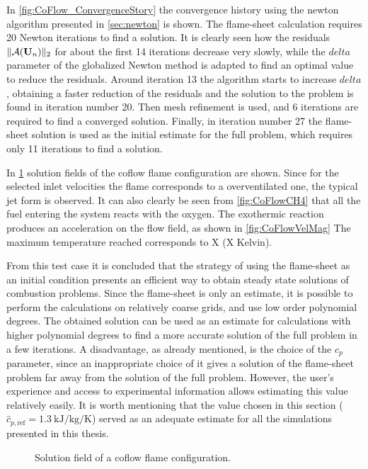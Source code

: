 In \cref{fig:CoFlow_ConvergenceStory} the convergence history using the newton algorithm presented in \cref{sec:newton} is shown. The flame-sheet calculation requires 20 Newton iterations to find a solution. It is clearly seen how the residuals $\| \mathcal{A}(\textbf{U}_{n}) \|_2 $  for about the first 14 iterations decrease very slowly, while the $delta$ parameter of the globalized Newton method is adapted to find an optimal value to reduce the residuals. Around iteration 13 the algorithm starts to increase $delta$, obtaining a faster reduction of the residuals and the solution to the problem is found in iteration number 20. Then mesh refinement is used, and 6 iterations are required to find a converged solution. Finally, in iteration number 27 the flame-sheet solution is used as the initial estimate for the full problem, which requires only 11 iterations to find a solution. 

In \cref{fig:CoFlowFlameFig} solution fields of the coflow flame configuration are shown. Since for the selected inlet velocities the flame corresponds to a overventilated one, the typical jet form is observed. It can also clearly be seen from \cref{fig:CoFlowCH4} that all the fuel entering the system reacts with the oxygen. The exothermic reaction produces an acceleration on the flow field, as shown in  \cref{fig:CoFlowVelMag}
The maximum temperature reached corresponds to X (X Kelvin). %

From this test case it is concluded that the strategy of using the flame-sheet as an initial condition presents an efficient way to obtain steady state solutions of combustion problems. Since the flame-sheet is only an estimate, it is possible to perform the calculations on relatively coarse grids, and use low order polynomial degrees. The obtained solution can be used as an estimate for calculations with higher polynomial degrees to find a more accurate solution of the full problem in a few iterations. A disadvantage, as already mentioned, is the choice of the $c_p$ parameter, since an inappropriate choice of it gives a solution of the flame-sheet problem far away from the solution of the full problem. However, the user's experience and access to experimental information allows estimating this value relatively easily. It is worth mentioning that the value chosen in this section ($\hat{c}_{p,\text{ref}}= \SI{1.3}{\kilo \joule \per \kilo \gram \per \kelvin}$)  served as an adequate estimate for all the simulations presented in this thesis.  


\begin{figure}[t]
	\centering
	\pgfplotsset{width=0.6\textwidth, compat=1.3}
	\par\bigskip
	\caption{Solution field of a coflow flame configuration.} \label{fig:CoFlowFlameFig}
\end{figure}

\FloatBarrier
